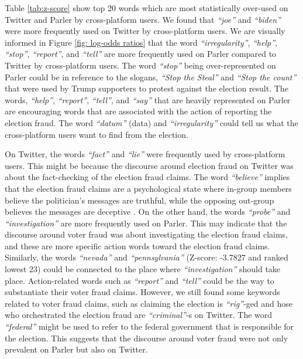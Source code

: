 \documentclass[Crown,sagev,times]{sagej}
\begin{document}
Table \ref{tab:z-score} show top 20 words which are most statistically over-used on Twitter and Parler by cross-platform users.
We found that \textit{``joe''} and \textit{``biden''} were more frequently used on Twitter by cross-platform users. 
We are visually informed in Figure \ref{fig: log-odds ratios} that the word \textit{``irregularity''}, \textit{``help''}, \textit{``stop''}, \textit{``report''}, and \textit{``tell''} are more frequently used on Parler compared to Twitter by cross-platform users. 
The word \textit{``stop''} being over-represented on Parler could be in reference to the slogans, \textit{``Stop the Steal''} and \textit{``Stop the count''} 
that were used by Trump supporters to protest against the election result.
The words, \textit{``help''}, \textit{``report''}, \textit{``tell''}, and \textit{``say''} that are heavily represented on Parler 
are encouraging words that are associated with the action of reporting the election fraud. The word \textit{``datum''} (data) and \textit{``irregularity''} 
could tell us what the cross-platform users want to find from the election.

On Twitter, the words \textit{``fact''} and \textit{``lie''} were frequently used by cross-platform users. 
This might be because the discourse around election fraud on Twitter was about the fact-checking of the election fraud claims. 
The word \textit{``believe''} implies that the election fraud claims are a psychological state where in-group members believe the politician's messages 
are truthful, while the opposing out-group believes the messages are deceptive \cite{ehrlich2015politics, clementson2018truth}. 
On the other hand, the words \textit{``probe''} and \textit{``investigation''} are more frequently used on Parler. 
This may indicate that the discourse around voter fraud was about investigating the election fraud claims, and these are more specific action words 
toward the election fraud claims. Similarly, the words \textit{``nevada''} and \textit{``pennsylvania''} (Z-score: -3.7827 and ranked lowest 23) 
could be connected to the place where \textit{``investigation''} should take place. 
Action-related words such as \textit{``report''} and \textit{``tell''} could be the way to substantiate their voter fraud claims. 
However, we still found some keywords related to voter fraud claims, such as claiming the election is \textit{``rig''}-ged and 
hose who orchestrated the election fraud are \textit{``criminal''}-s on Twitter. The word \textit{``federal''} might be used 
to refer to the federal government that is responsible for the election. 
This suggests that the discourse around voter fraud were not only prevalent on Parler but also on Twitter.
\end{document}
